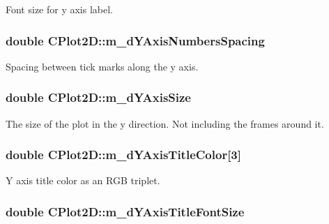 Font size for y axis label. \hypertarget{class_c_plot2_d_a1da4a09b339259f8123539a470be2d3b}{
\subsubsection[{m\-\_\-d\-Y\-Axis\-Numbers\-Spacing}]{\setlength{\rightskip}{0pt plus 5cm}double C\-Plot2\-D\-::m\-\_\-d\-Y\-Axis\-Numbers\-Spacing\hspace{0.3cm}{\ttfamily [protected]}}}\label{class_c_plot2_d_a1da4a09b339259f8123539a470be2d3b}
Spacing between tick marks along the y axis. \hypertarget{class_c_plot2_d_acd9184665f0dd2c0afbf367cf6dc3f4b}{
\subsubsection[{m\-\_\-d\-Y\-Axis\-Size}]{\setlength{\rightskip}{0pt plus 5cm}double C\-Plot2\-D\-::m\-\_\-d\-Y\-Axis\-Size\hspace{0.3cm}{\ttfamily [protected]}}}\label{class_c_plot2_d_acd9184665f0dd2c0afbf367cf6dc3f4b}
The size of the plot in the y direction. Not including the frames around it. \hypertarget{class_c_plot2_d_afbe19e1ea967b1d015e8081eebfcfbad}{
\subsubsection[{m\-\_\-d\-Y\-Axis\-Title\-Color}]{\setlength{\rightskip}{0pt plus 5cm}double C\-Plot2\-D\-::m\-\_\-d\-Y\-Axis\-Title\-Color\mbox{[}3\mbox{]}\hspace{0.3cm}{\ttfamily [protected]}}}\label{class_c_plot2_d_afbe19e1ea967b1d015e8081eebfcfbad}
Y axis title color as an R\-G\-B triplet. \hypertarget{class_c_plot2_d_a0c0dbccc68c5265ff35ba519e183227d}{
\subsubsection[{m\-\_\-d\-Y\-Axis\-Title\-Font\-Size}]{\setlength{\rightskip}{0pt plus 5cm}double C\-Plot2\-D\-::m\-\_\-d\-Y\-Axis\-Title\-Font\-Size\hspace{0.3cm}{\ttfamily [protected]}}}\label{class_c_plot2_d_a0c0dbccc68c5265ff35ba519e183227d}
